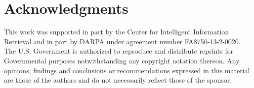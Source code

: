 \documentclass[11pt,a4paper]{article}
\begin{document}
\section*{Acknowledgments}
This work was supported in part by the Center for Intelligent Information Retrieval and in part by DARPA under agreement number FA8750-13-2-0020. The U.S. Government is authorized to reproduce and distribute reprints for Governmental purposes notwithstanding any copyright notation thereon. Any opinions, findings and conclusions or recommendations expressed in this material are those of the authors and do not necessarily reflect those of the sponsor.


%
%
\end{document}
